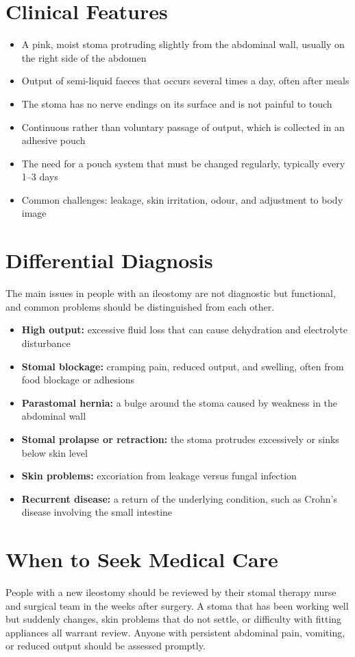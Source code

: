 \section*{Clinical Features}
\begin{itemize}
    \item A pink, moist stoma protruding slightly from the abdominal wall, usually on the right side of the abdomen
    \item Output of semi-liquid faeces that occurs several times a day, often after meals
    \item The stoma has no nerve endings on its surface and is not painful to touch
    \item Continuous rather than voluntary passage of output, which is collected in an adhesive pouch
    \item The need for a pouch system that must be changed regularly, typically every 1--3 days
    \item Common challenges: leakage, skin irritation, odour, and adjustment to body image
\end{itemize}

\section*{Differential Diagnosis}
The main issues in people with an ileostomy are not diagnostic but functional, and common problems should be distinguished from each other.
\begin{itemize}
    \item \textbf{High output:} excessive fluid loss that can cause dehydration and electrolyte disturbance
    \item \textbf{Stomal blockage:} cramping pain, reduced output, and swelling, often from food blockage or adhesions
    \item \textbf{Parastomal hernia:} a bulge around the stoma caused by weakness in the abdominal wall
    \item \textbf{Stomal prolapse or retraction:} the stoma protrudes excessively or sinks below skin level
    \item \textbf{Skin problems:} excoriation from leakage versus fungal infection
    \item \textbf{Recurrent disease:} a return of the underlying condition, such as Crohn's disease involving the small intestine
\end{itemize}

\section*{When to Seek Medical Care}
People with a new ileostomy should be reviewed by their stomal therapy nurse and surgical team in the weeks after surgery. A stoma that has been working well but suddenly changes, skin problems that do not settle, or difficulty with fitting appliances all warrant review. Anyone with persistent abdominal pain, vomiting, or reduced output should be assessed promptly.

